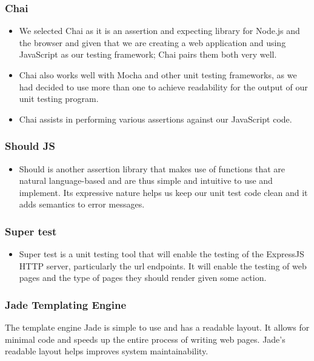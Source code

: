 \subsubsection{Chai}
\begin{itemize}
	\item We selected Chai as it is an assertion and expecting library for Node.js and the browser and given that we are creating a web application and using JavaScript as our testing framework; Chai pairs them both very well.
\item Chai also works well with Mocha and other unit testing frameworks, as we had decided to use more than one to achieve readability for the output of our unit testing program. 
\item Chai assists in performing various assertions against our JavaScript code.
\end{itemize}

\subsubsection{Should JS}
\begin{itemize}
	\item Should is another assertion library that makes use of functions that are natural language-based and are thus simple and intuitive to use and implement. Its expressive nature helps us keep our unit test code clean and it adds semantics to error messages.
\end{itemize}


\subsubsection{Super test}
\begin{itemize}
	\item Super test is a unit testing tool that will enable the testing of the ExpressJS HTTP server, particularly the url endpoints. It will enable the testing of web pages and the type of pages they should render given some action.
\end{itemize}


\subsubsection{Jade Templating Engine}
The template engine Jade is simple to use and has a readable layout. It allows for minimal code and speeds up the entire process of writing web pages. Jade's readable layout helps improves system maintainability.


